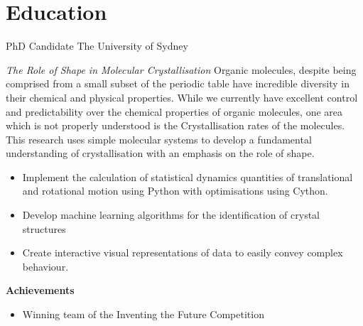 



\makecvtitle{}

\vspace{-4em}
\section{Education}

{PhD Candidate}
{The University of Sydney}{}{}
{%
  \emph{The Role of Shape in Molecular Crystallisation}
  Organic molecules, despite being comprised from a small subset of the periodic table
  have incredible diversity in their chemical and physical properties.
  While we currently have excellent control and predictability over
  the chemical properties of organic molecules,
  one area which is not properly understood is
  the Crystallisation rates of the molecules.
  This research uses simple molecular systems to
  develop a fundamental understanding of crystallisation
  with an emphasis on the role of shape.
  \begin{itemize}
    \item Implement the calculation of statistical dynamics quantities of translational and rotational motion
      using Python with optimisations using Cython.
    \item Develop machine learning algorithms for the identification of crystal structures
    \item Create interactive visual representations of data to easily convey complex behaviour.
  \end{itemize}
  \textbf{Achievements}
  \begin{itemize}
    \item Winning team of the Inventing the Future Competition
  \end{itemize}
}
\vspace{1em}


